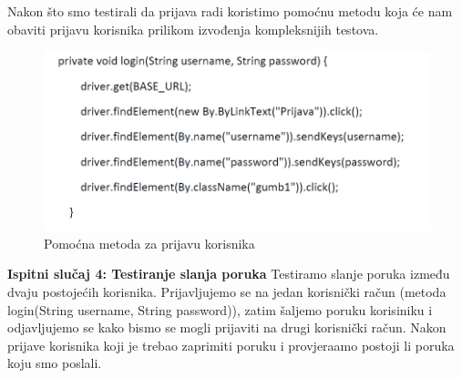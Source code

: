 			
			Nakon što smo testirali da prijava radi koristimo pomoćnu metodu koja će nam obaviti prijavu korisnika prilikom izvođenja kompleksnijih testova. 
			
			\begin{figure}[H]
				\includegraphics[scale=0.6]{slike/login.PNG} %
				\centering
				\caption{Pomoćna metoda za prijavu korisnika}
				\label{fig:login}
			\end{figure}
			
			
			\textbf{Ispitni slučaj 4: Testiranje slanja poruka
				}
			Testiramo slanje poruka između dvaju postojećih korisnika. Prijavljujemo se na jedan korisnički račun (metoda login(String username, String password)), zatim šaljemo poruku korisiniku i odjavljujemo se kako bismo se mogli prijaviti na drugi korisnički račun. Nakon prijave korisnika koji je trebao zaprimiti poruku i provjeraamo postoji li poruka koju smo poslali.
			
